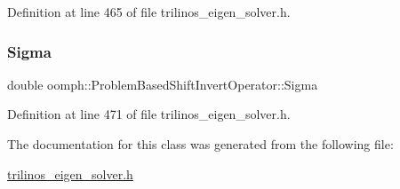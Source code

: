 Definition at line 465 of file trilinos\+\_\+eigen\+\_\+solver.\+h.

\mbox{\label{classoomph_1_1ProblemBasedShiftInvertOperator_a1348c664118ba4fbd87158e2d5d2caef}} 
\subsubsection{\texorpdfstring{Sigma}{Sigma}}
{\footnotesize\ttfamily double oomph\+::\+Problem\+Based\+Shift\+Invert\+Operator\+::\+Sigma\hspace{0.3cm}{\ttfamily [private]}}



Definition at line 471 of file trilinos\+\_\+eigen\+\_\+solver.\+h.



The documentation for this class was generated from the following file\+:\begin{DoxyCompactItemize}
\item 
\hyperlink{trilinos__eigen__solver_8h}{trilinos\+\_\+eigen\+\_\+solver.\+h}\end{DoxyCompactItemize}
